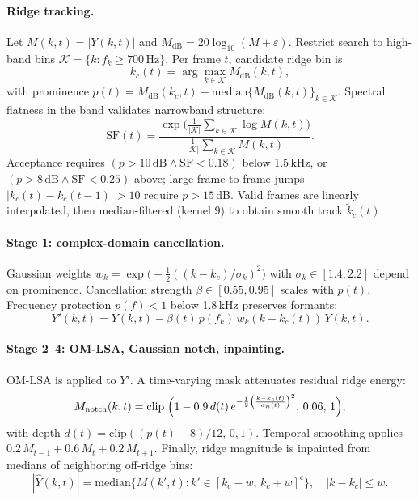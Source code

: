 \paragraph{Ridge tracking.}
Let $M(k,t)=|Y(k,t)|$ and $M_{\mathrm{dB}}=20\log_{10}(M+\varepsilon)$. Restrict search to high-band bins $\mathcal{K}=\{k: f_k\ge 700\,\mathrm{Hz}\}$. Per frame $t$, candidate ridge bin is
\begin{equation}
  k_c(t) = \arg\max_{k\in\mathcal{K}} M_{\mathrm{dB}}(k,t),
\end{equation}
with prominence $p(t)=M_{\mathrm{dB}}(k_c,t)-\mathrm{median}\{M_{\mathrm{dB}}(k,t)\}_{k\in\mathcal{K}}$. Spectral flatness in the band validates narrowband structure:
\begin{equation}
  \mathrm{SF}(t) = \frac{\exp\bigl(\frac{1}{|\mathcal{K}|}\sum_{k\in\mathcal{K}}\log M(k,t)\bigr)}{\frac{1}{|\mathcal{K}|}\sum_{k\in\mathcal{K}} M(k,t)}.
  \label{eq:spec_flat}
\end{equation}
Acceptance requires $(p>10\,\mathrm{dB} \land \mathrm{SF}<0.18)$ below 1.5\,kHz, or $(p>8\,\mathrm{dB} \land \mathrm{SF}<0.25)$ above; large frame-to-frame jumps $|k_c(t)-k_c(t-1)|>10$ require $p>15$\,dB. Valid frames are linearly interpolated, then median-filtered (kernel 9) to obtain smooth track $\tilde{k}_c(t)$.

\paragraph{Stage 1: complex-domain cancellation.}
Gaussian weights $w_k=\exp\bigl(-\tfrac{1}{2}((k-k_c)/\sigma_k)^2\bigr)$ with $\sigma_k\in[1.4,2.2]$ depend on prominence. Cancellation strength $\beta\in[0.55,0.95]$ scales with $p(t)$. Frequency protection $p(f)<1$ below 1.8\,kHz preserves formants:
\begin{equation}
  Y'(k,t) = Y(k,t) - \beta(t)\, p(f_k)\, w_k(k-k_c(t))\, Y(k,t).
  \label{eq:chirp_cancel}
\end{equation}

\paragraph{Stage 2--4: OM-LSA, Gaussian notch, inpainting.}
OM-LSA is applied to $Y'$. A time-varying mask attenuates residual ridge energy:
\begin{equation}
  M_{\mathrm{notch}}(k,t) = \mathrm{clip}\;\Bigl(1 - 0.9\, d(t)\, e^{-\frac{1}{2}\left(\frac{k-k_c(t)}{\sigma_n(t)}\right)^2},\, 0.06,\, 1\Bigr),
\end{equation}
with depth $d(t)=\mathrm{clip}((p(t)-8)/12,\,0,1)$. Temporal smoothing applies $0.2\,M_{t-1}+0.6\,M_t+0.2\,M_{t+1}$. Finally, ridge magnitude is inpainted from medians of neighboring off-ridge bins:
\begin{equation}
  |\hat{Y}(k,t)| = \mathrm{median}\bigl\{M(k',t): k'\in [k_c-w,\, k_c+w]^c\bigr\}, \quad |k-k_c|\le w.
  \label{eq:chirp_inpaint}
\end{equation}

